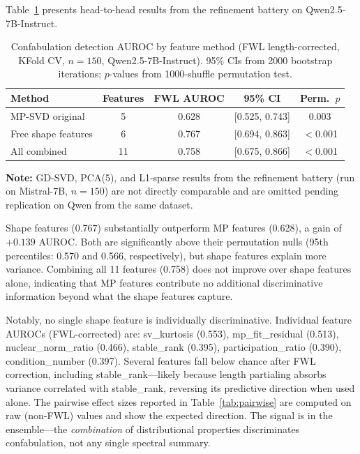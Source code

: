 \documentclass[11pt,a4paper]{article}
\begin{document}
Table~\ref{tab:refinement} presents head-to-head results from the
refinement battery on Qwen2.5-7B-Instruct.

\begin{table}[h]
\centering
\caption{Confabulation detection AUROC by feature method (FWL
  length-corrected, KFold CV, $n=150$, Qwen2.5-7B-Instruct).
  95\% CIs from 2000 bootstrap iterations; $p$-values from
  1000-shuffle permutation test.}
\label{tab:refinement}
\begin{tabular}{lcccc}
\toprule
\textbf{Method} & \textbf{Features} & \textbf{FWL AUROC} & \textbf{95\% CI} & \textbf{Perm.\ $p$} \\
\midrule
MP-SVD original & 5 & 0.628 & [0.525, 0.743] & 0.003 \\
Free shape features & 6 & 0.767 & [0.694, 0.863] & $<$0.001 \\
All combined & 11 & 0.758 & [0.675, 0.866] & $<$0.001 \\
\bottomrule
\end{tabular}
\end{table}

\textbf{Note:} GD-SVD, PCA(5), and L1-sparse results from the
refinement battery (run on Mistral-7B, $n=150$) are not directly
comparable and are omitted pending replication on Qwen from the same
dataset.

Shape features (0.767) substantially outperform MP features (0.628),
a gain of $+0.139$ AUROC. Both are significantly above their permutation
nulls (95th percentiles: 0.570 and 0.566, respectively), but shape features explain more
variance. Combining all 11 features (0.758) does not improve over
shape features alone, indicating that MP features contribute no
additional discriminative information beyond what the shape features
capture.

Notably, no single shape feature is individually discriminative.
Individual feature AUROCs (FWL-corrected) are: sv\_kurtosis (0.553),
mp\_fit\_residual (0.513), nuclear\_norm\_ratio (0.466),
stable\_rank (0.395), participation\_ratio (0.390),
condition\_number (0.397). Several features fall below chance after
FWL correction, including stable\_rank---likely because length
partialing absorbs variance correlated with stable\_rank, reversing
its predictive direction when used alone. The pairwise effect sizes
reported in Table~\ref{tab:pairwise} are computed on raw (non-FWL)
values and show the expected direction. The signal is in the
ensemble---the \emph{combination} of distributional properties
discriminates confabulation, not any single spectral summary.
\end{document}

